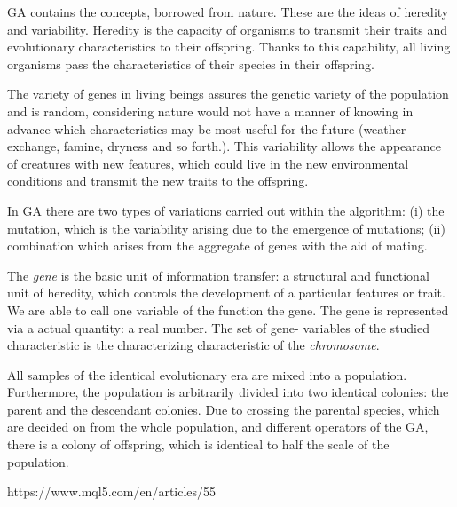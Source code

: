 GA contains the concepts, borrowed from nature. These are the ideas of heredity and variability. Heredity is the capacity of organisms to transmit their traits and evolutionary characteristics to their offspring. Thanks to this capability, all living organisms pass the characteristics of their species in their offspring.

The variety of genes in living beings assures the genetic variety of the population and is random, considering nature would not have a manner of knowing in advance which characteristics may be most useful for the future (weather exchange, famine, dryness and so forth.). This variability allows the appearance of creatures with new features, which could live in the new environmental conditions and transmit the new traits to the offspring.

In GA there are two types of variations carried out within the algorithm: (i) the mutation, which is the variability arising due to the emergence of mutations; (ii) combination which arises from the aggregate of genes with the aid of mating.

The \textit{gene} is the basic unit of information transfer: a structural and functional unit of heredity, which controls the development of a particular features or trait. We are able to call one variable of the function the gene. The gene is represented via a actual quantity: a real number. The set of gene- variables of the studied characteristic is the characterizing characteristic of the \textit{chromosome}.

All samples of the identical evolutionary era are mixed into a population. Furthermore, the population is arbitrarily divided into two identical colonies: the parent and the descendant colonies. Due to crossing the parental species, which are decided on from the whole population, and different operators of the GA, there is a colony of offspring, which is identical to half the scale of the population.


https://www.mql5.com/en/articles/55